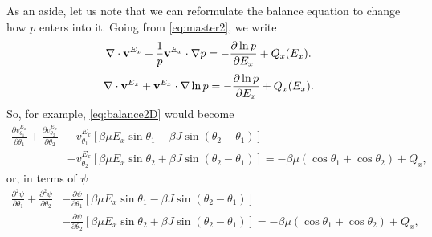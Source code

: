 \documentclass[11pt,reqno]{amsart}
\begin{document}
As an aside, let us note that we can reformulate the balance equation to change how $p$ enters into it.  Going from \eqref{eq:master2}, we write
\begin{equation*}
\nabla\cdot{\bf v}^{E_x}+\frac{1}{p}{\bf v}^{E_x}\cdot\nabla p=-\frac{\partial \ln p}{\partial E_x}+Q_x(E_x).%
\end{equation*}
\begin{equation}
\label{eq:master3}
\nabla\cdot{\bf v}^{E_x}+{\bf v}^{E_x}\cdot\nabla \ln p=-\frac{\partial \ln p}{\partial E_x}+Q_x(E_x).%
\end{equation}
So, for example, \eqref{eq:balance2D} would become
\begin{align}
\label{eq:balance2D3}
\frac{\partial { v}^{E_x}_{\theta_1}}{\partial \theta_1} + \frac{\partial { v}^{E_x}_{\theta_2}}{\partial \theta_2} 
&- { v}^{E_x}_{\theta_1} [\beta\mu E_x \sin\theta_1 - \beta J \sin(\theta_2-\theta_1)]\nonumber\\
&- { v}^{E_x}_{\theta_2} [\beta\mu E_x \sin\theta_2 + \beta J \sin(\theta_2-\theta_1)]= -\beta\mu(\cos\theta_1+\cos\theta_2) + Q_x,
\end{align}
or, in terms of $\psi$
\begin{align}
\label{eq:balance2D4}
\frac{\partial^2 \psi}{\partial \theta_1} + \frac{\partial^2\psi }{\partial \theta_2} 
&- \frac{\partial \psi}{\partial \theta_1} [\beta\mu E_x \sin\theta_1 - \beta J \sin(\theta_2-\theta_1)]\nonumber\\
&- \frac{\partial \psi}{\partial\theta_2} [\beta\mu E_x \sin\theta_2 + \beta J \sin(\theta_2-\theta_1)]=- \beta\mu(\cos\theta_1+\cos\theta_2) + Q_x,
\end{align}
\end{document}
